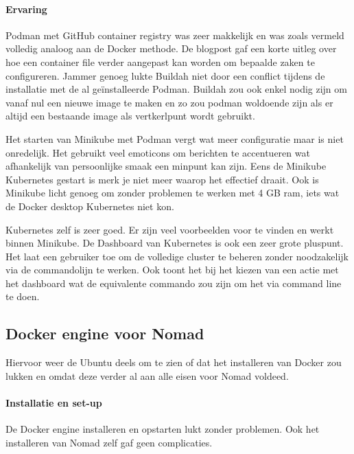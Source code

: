 \paragraph{Ervaring}
Podman met GitHub container registry was zeer makkelijk en was zoals vermeld volledig analoog aan de Docker methode. De blogpost gaf een korte uitleg over hoe een container file verder aangepast kan worden om bepaalde zaken te configureren. Jammer genoeg lukte Buildah niet door een conflict tijdens de installatie met de al geïnstalleerde Podman. Buildah zou ook enkel nodig zijn om vanaf nul een nieuwe image te maken en zo zou podman woldoende zijn als er altijd een bestaande image als vertkerlpunt wordt gebruikt.

Het starten van Minikube met Podman vergt wat meer configuratie maar is niet onredelijk. Het gebruikt veel emoticons om berichten te accentueren wat afhankelijk van persoonlijke smaak een minpunt kan zijn. Eens de Minikube Kubernetes gestart is merk je niet meer waarop het effectief draait. Ook is Minikube licht genoeg om zonder problemen te werken met 4 GB ram, iets wat de Docker desktop Kubernetes niet kon.

Kubernetes zelf is zeer goed. Er zijn veel voorbeelden voor te vinden en werkt binnen Minikube. De Dashboard van Kubernetes is ook een zeer grote pluspunt. Het laat een gebruiker toe om de volledige cluster te beheren zonder noodzakelijk via de commandolijn te werken. Ook toont het bij het kiezen van een actie met het dashboard wat de equivalente commando zou zijn om het via command line te doen.


\subsection{Docker engine voor Nomad}
Hiervoor weer de Ubuntu deels om te zien of dat het installeren van Docker zou lukken en omdat deze verder al aan alle eisen voor Nomad voldeed.
\paragraph{Installatie en set-up}
De Docker engine installeren en opstarten lukt zonder problemen. Ook het installeren van Nomad zelf gaf geen complicaties.

